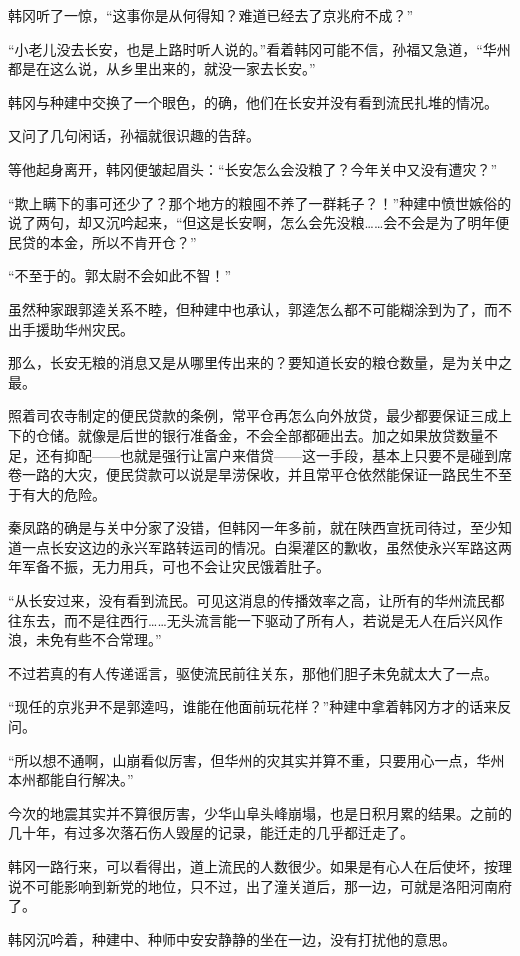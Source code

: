 韩冈听了一惊，“这事你是从何得知？难道已经去了京兆府不成？”

“小老儿没去长安，也是上路时听人说的。”看着韩冈可能不信，孙福又急道，“华州都是在这么说，从乡里出来的，就没一家去长安。”

韩冈与种建中交换了一个眼色，的确，他们在长安并没有看到流民扎堆的情况。

又问了几句闲话，孙福就很识趣的告辞。

等他起身离开，韩冈便皱起眉头：“长安怎么会没粮了？今年关中又没有遭灾？”

“欺上瞒下的事可还少了？那个地方的粮囤不养了一群耗子？！”种建中愤世嫉俗的说了两句，却又沉吟起来，“但这是长安啊，怎么会先没粮……会不会是为了明年便民贷的本金，所以不肯开仓？”

“不至于的。郭太尉不会如此不智！”

虽然种家跟郭逵关系不睦，但种建中也承认，郭逵怎么都不可能糊涂到为了，而不出手援助华州灾民。

那么，长安无粮的消息又是从哪里传出来的？要知道长安的粮仓数量，是为关中之最。

照着司农寺制定的便民贷款的条例，常平仓再怎么向外放贷，最少都要保证三成上下的仓储。就像是后世的银行准备金，不会全部都砸出去。加之如果放贷数量不足，还有抑配——也就是强行让富户来借贷——这一手段，基本上只要不是碰到席卷一路的大灾，便民贷款可以说是旱涝保收，并且常平仓依然能保证一路民生不至于有大的危险。

秦凤路的确是与关中分家了没错，但韩冈一年多前，就在陕西宣抚司待过，至少知道一点长安这边的永兴军路转运司的情况。白渠灌区的歉收，虽然使永兴军路这两年军备不振，无力用兵，可也不会让灾民饿着肚子。

“从长安过来，没有看到流民。可见这消息的传播效率之高，让所有的华州流民都往东去，而不是往西行……无头流言能一下驱动了所有人，若说是无人在后兴风作浪，未免有些不合常理。”

不过若真的有人传递谣言，驱使流民前往关东，那他们胆子未免就太大了一点。

“现任的京兆尹不是郭逵吗，谁能在他面前玩花样？”种建中拿着韩冈方才的话来反问。

“所以想不通啊，山崩看似厉害，但华州的灾其实并算不重，只要用心一点，华州本州都能自行解决。”

今次的地震其实并不算很厉害，少华山阜头峰崩塌，也是日积月累的结果。之前的几十年，有过多次落石伤人毁屋的记录，能迁走的几乎都迁走了。

韩冈一路行来，可以看得出，道上流民的人数很少。如果是有心人在后使坏，按理说不可能影响到新党的地位，只不过，出了潼关道后，那一边，可就是洛阳河南府了。

韩冈沉吟着，种建中、种师中安安静静的坐在一边，没有打扰他的意思。

